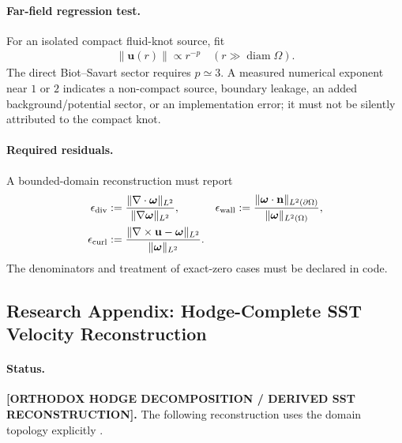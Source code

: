     \paragraph{Far-field regression test.}
    For an isolated compact fluid-knot source, fit
    \begin{align}
        \left\|\mathbf u(r)\right\|
        \propto
        r^{-p}
        \quad(r\gg\operatorname{diam}\Omega).
        \label{eq:rt_biot_savart_far_field_fit}
    \end{align}
    The direct Biot--Savart sector requires \(p\simeq3\).  A measured numerical
    exponent near \(1\) or \(2\) indicates a non-compact source, boundary leakage,
    an added background/potential sector, or an implementation error; it must not be
    silently attributed to the compact knot.

    \paragraph{Required residuals.}
    A bounded-domain reconstruction must report
    \begin{align}
        \epsilon_{\rm div}
        &:={
        \|\nabla\cdot\boldsymbol\omega\|_{L^2}
        \over
        \|\nabla\boldsymbol\omega\|_{L^2}},
        &
        \epsilon_{\rm wall}
        &:={
        \|\boldsymbol\omega\cdot\mathbf n\|_{L^2(\partial\Omega)}
        \over
        \|\boldsymbol\omega\|_{L^2(\Omega)}},
        \notag\\
        \epsilon_{\rm curl}
        &:={
        \|\nabla\times\mathbf u-\boldsymbol\omega\|_{L^2}
        \over
        \|\boldsymbol\omega\|_{L^2}}.
        \label{eq:rt_biot_savart_residuals}
    \end{align}
    The denominators and treatment of exact-zero cases must be declared in code.

\subsection{Research Appendix: Hodge-Complete SST Velocity Reconstruction}
    \label{subsec:rt_hodge_complete_reconstruction}

    \paragraph{Status.}
    \textbf{[ORTHODOX HODGE DECOMPOSITION / DERIVED SST RECONSTRUCTION].}
    The following reconstruction uses the domain topology explicitly
    \cite{CantarellaDeTurckGluck2002Hodge}.

